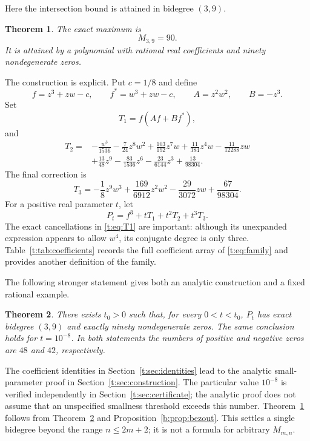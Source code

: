 \documentclass[UTF8,11pt]{ctexart}
\newtheorem{thm}{Theorem}[section]
\theoremstyle{definition}
\numberwithin{equation}{section}
\begin{document}
Here the intersection bound is attained in bidegree $(3,9)$.
\begin{thm}\label{t:thm:main}
The exact maximum is
\[
 M_{3,9}=90.
\]
It is attained by a polynomial with rational real coefficients and
ninety nondegenerate zeros.
\end{thm}

The construction is explicit. Put $c=1/8$ and define
\begin{equation}\label{t:eq:seed}
 f=z^3+zw-c,\qquad f^*=w^3+zw-c,\qquad
 A=z^2w^2,\qquad B=-z^3.
\end{equation}
Set
\begin{equation}\label{t:eq:T1}
 T_1=f(Af+Bf^*),
\end{equation}
and
\begin{equation}\label{t:eq:T2}
\begin{split}
 T_2={}&-\frac{w^3}{1536}-\frac{7}{24}z^8w^2
 +\frac{103}{192}z^7w+\frac{11}{384}z^4w
 -\frac{11}{12288}zw\\
 &+\frac{13}{48}z^9-\frac{83}{1536}z^6
 -\frac{23}{6144}z^3+\frac{13}{98304}.
\end{split}
\end{equation}
The final correction is
\begin{equation}\label{t:eq:T3}
 T_3=-\frac18 z^9w^3+\frac{169}{6912}z^2w^2
       -\frac{29}{3072}zw+\frac{67}{98304}.
\end{equation}
For a positive real parameter $t$, let
\begin{equation}\label{t:eq:family}
 P_t=f^3+tT_1+t^2T_2+t^3T_3.
\end{equation}
The exact cancellations in \eqref{t:eq:T1} are important: although its
unexpanded expression appears to allow $w^4$, its conjugate degree is
only three. Table~\ref{t:tab:coefficients} records the full coefficient
array of \eqref{t:eq:family} and provides another definition of the family.

The following stronger statement gives both an analytic construction
and a fixed rational example.
\begin{thm}\label{t:thm:family}
There exists $t_0>0$ such that, for every $0<t<t_0$, $P_t$ has exact
bidegree $(3,9)$ and exactly ninety nondegenerate zeros. The same
conclusion holds for $t=10^{-8}$. In both statements the numbers of
positive and negative zeros are $48$ and $42$, respectively.
\end{thm}

The coefficient identities in Section~\ref{t:sec:identities} lead to
the analytic small-parameter proof in Section~\ref{t:sec:construction}. The particular value $10^{-8}$ is
verified independently in Section~\ref{t:sec:certificate}; the analytic
proof does not assume that an unspecified smallness threshold exceeds
this number. Theorem~\ref{t:thm:main} follows from
Theorem~\ref{t:thm:family} and Proposition~\ref{b:prop:bezout}.
This settles a single bidegree beyond the range $n\le2m+2$; it is not a
formula for arbitrary $M_{m,n}$.
\end{document}
